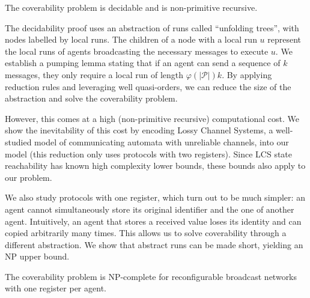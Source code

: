 \documentclass{article}
\newcommand{\size}[1]{|#1|}
\theoremstyle{definition}
\begin{document}
	\begin{theorem}
		The coverability problem is decidable and is non-primitive recursive.
	\end{theorem}

The decidability proof uses an abstraction of runs called ``unfolding trees'', with nodes labelled by local runs. The children of a node with a local run $u$ represent the local runs of agents broadcasting the necessary messages to execute $u$.
We establish a pumping lemma stating that if an agent can send a sequence of $k$ messages, they only require a local run of length $\varphi(\size{\mathcal{P}})k$.
By applying reduction rules and leveraging well quasi-orders, we can reduce the size of the abstraction and solve the coverability problem. 

However, this comes at a high (non-primitive recursive) computational cost. We show the inevitability of this cost by encoding Lossy Channel Systems, a well-studied model of communicating automata with unreliable channels, into our model (this reduction only uses protocols with two registers).
Since LCS state reachability has known high complexity lower bounds, these bounds also apply to our problem.
	
	
	We also study protocols with one register, which turn out to be much simpler: an agent cannot simultaneously store its original identifier and the one of another agent. Intuitively, an agent that stores a received value loses its identity and can copied arbitrarily many times.
	This allows us to solve coverability through a different abstraction. We show that abstract runs can be made short, yielding an NP upper bound.
	
	\begin{theorem}
		The coverability problem is NP-complete for reconfigurable broadcast networks with one register per agent.
	\end{theorem}
	
\end{document}
